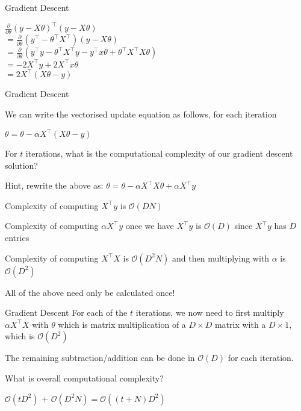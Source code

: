 \documentclass[usenames,dvipsnames]{beamer}
\begin{document}
\begin{frame}{Gradient Descent}


\(\frac{\partial}{\partial \theta}(y-X \theta)^{\top}(y-X \theta)\)
\\ \(=\frac{\partial}{\partial \theta}\left(y^{\top}-\theta^{\top} X^{\top}\right)(y-X \theta)\)
\\ \(=\frac{\partial}{\partial \theta}\left(y^{\top} y-\theta^{\top} X^{\top} y-y^{\top} x \theta+\theta^{\top} X^{\top} X \theta\right)\)
\\ \(=-2 X^{\top} y+2 X^{\top} x \theta\)
\\ \(=2 X^{\top}(X \theta-y)\)
	

\end{frame}

\begin{frame}{Gradient Descent}


We can write the vectorised update equation as follows, for each iteration

\(\theta=\theta - \alpha X^{\top}(X \theta-y)\) 


\pause For $t$ iterations, what is the computational complexity of our gradient descent solution?

\pause Hint, rewrite the above as: \(\theta=\theta - \alpha X^{\top}X \theta+ \alpha X^{\top}y\) 

\pause Complexity of computing $X^{\top}y$ is $\mathcal{O}(DN)$

\pause Complexity of computing $\alpha X^{\top}y$ once we have $X^{\top}y$ is $\mathcal{O}(D)$ since  $X^{\top}y$ has $D$ entries

\pause Complexity of computing $X^{\top}X$ is $\mathcal{O}(D^2N)$ and then multiplying with $\alpha$ is  $\mathcal{O}(D^2)$

\pause All of the above need only be calculated once!



\end{frame}



\begin{frame}{Gradient Descent}
\pause For each of the $t$ iterations, we now need to first multiply  $\alpha X^{\top}X$ with $\theta$ which is matrix multiplication of a $D \times D$ matrix with a $D \times 1$, which is $\mathcal{O}(D^2)$ 

\pause The remaining subtraction/addition can be done in $\mathcal{O}(D)$ for each iteration.

\pause What is overall computational complexity?

\pause $\mathcal{O}(tD^2)$ + $\mathcal{O}(D^2N) = \mathcal{O}((t+N)D^2)$
\end{frame}
\end{document}
